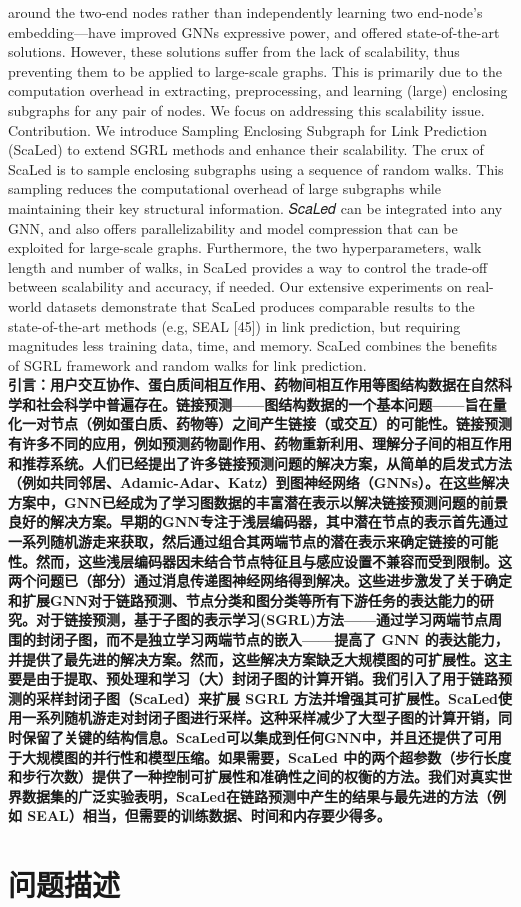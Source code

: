 \documentclass{article}
\begin{document}
{around the two-end nodes rather than independently learning two
end-node’s embedding—have improved GNNs expressive power,
and offered state-of-the-art solutions. However, these solutions suffer from the lack of scalability, thus preventing them to be applied
to large-scale graphs. This is primarily due to the computation
overhead in extracting, preprocessing, and learning (large) enclosing subgraphs for any pair of nodes. We focus on addressing this
scalability issue.
Contribution. We introduce Sampling Enclosing Subgraph for Link
Prediction (ScaLed) to extend SGRL methods and enhance their scalability. The crux of ScaLed is to sample enclosing subgraphs using
a sequence of random walks. This sampling reduces the computational overhead of large subgraphs while maintaining their key
structural information. 𝑆𝑐𝑎𝐿𝑒𝑑 can be integrated into any GNN,
and also offers parallelizability and model compression that can be
exploited for large-scale graphs. Furthermore, the two hyperparameters, walk length and number of walks, in ScaLed provides a way
to control the trade-off between scalability and accuracy, if needed.
Our extensive experiments on real-world datasets demonstrate that
ScaLed produces comparable results to the state-of-the-art methods
(e.g, SEAL [45]) in link prediction, but requiring magnitudes less
training data, time, and memory. ScaLed combines the benefits of
SGRL framework and random walks for link prediction.
}\\
\textbf{引言：用户交互协作、蛋白质间相互作用、药物间相互作用等图结构数据在自然科学和社会科学中普遍存在。链接预测——图结构数据的一个基本问题——旨在量化一对节点（例如蛋白质、药物等）之间产生链接（或交互）的可能性。链接预测有许多不同的应用，例如预测药物副作用、药物重新利用、理解分子间的相互作用和推荐系统。人们已经提出了许多链接预测问题的解决方案，从简单的启发式方法（例如共同邻居、Adamic-Adar、Katz）到图神经网络（GNNs）。在这些解决方案中，GNN已经成为了学习图数据的丰富潜在表示以解决链接预测问题的前景良好的解决方案。早期的GNN专注于浅层编码器，其中潜在节点的表示首先通过一系列随机游走来获取，然后通过组合其两端节点的潜在表示来确定链接的可能性。然而，这些浅层编码器因未结合节点特征且与感应设置不兼容而受到限制。这两个问题已（部分）通过消息传递图神经网络得到解决。这些进步激发了关于确定和扩展GNN对于链路预测、节点分类和图分类等所有下游任务的表达能力的研究。对于链接预测，基于子图的表示学习(SGRL)方法——通过学习两端节点周围的封闭子图，而不是独立学习两端节点的嵌入——提高了 GNN 的表达能力，并提供了最先进的解决方案。然而，这些解决方案缺乏大规模图的可扩展性。这主要是由于提取、预处理和学习（大）封闭子图的计算开销。我们引入了用于链路预测的采样封闭子图（ScaLed）来扩展 SGRL 方法并增强其可扩展性。ScaLed使用一系列随机游走对封闭子图进行采样。这种采样减少了大型子图的计算开销，同时保留了关键的结构信息。ScaLed可以集成到任何GNN中，并且还提供了可用于大规模图的并行性和模型压缩。如果需要，ScaLed 中的两个超参数（步行长度和步行次数）提供了一种控制可扩展性和准确性之间的权衡的方法。我们对真实世界数据集的广泛实验表明，ScaLed在链路预测中产生的结果与最先进的方法（例如 SEAL）相当，但需要的训练数据、时间和内存要少得多。}
\section*{问题描述}
\end{document}
